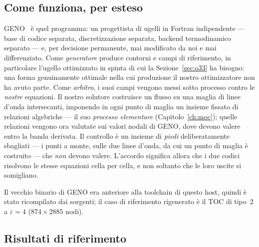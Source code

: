 \subsection{Come funziona, per esteso}

GENO~\cite{geno} è quel programma: un progettista di ugelli in
Fortran indipendente --- base di codice separata, discretizzazione
separata, backend termodinamico separato --- e, per decisione
permanente, mai modificato da noi e mai differenziato. Come
\emph{generatore} produce contorni e campi di riferimento, in
particolare l'ugello ottimizzato in spinta di cui la
Sezione~\ref{sec:o33} ha bisogno: una forma genuinamente ottimale
nella cui produzione il nostro ottimizzatore non ha avuto parte. Come
\emph{arbitro}, i suoi campi vengono messi sotto processo contro le
\emph{nostre} equazioni. Il nostro solutore costruisce un flusso su
una maglia di linee d'onda intersecanti, imponendo in ogni punto di
maglia un insieme fissato di relazioni algebriche --- il suo
\emph{processo elementare} (Capitolo~\ref{ch:moc}); quelle relazioni
vengono ora valutate sui valori nodali di GENO, dove devono valere
entro la banda derivata. Il controllo è un insieme di \emph{piedi}
deliberatamente sbagliati --- i punti a monte, sulle due linee
d'onda, da cui un punto di maglia è costruito --- che \emph{non}
devono valere. L'accordo significa allora che i due codici risolvono
le stesse equazioni cella per cella, e non soltanto che le loro
uscite si somigliano.

Il vecchio binario di GENO era anteriore alla toolchain di questo
host, quindi è stato ricompilato dai sorgenti; il caso di riferimento
rigenerato è il TOC di tipo~2 a $\varepsilon = 4$ ($874\times2885$
nodi).

\subsection{Risultati di riferimento}

